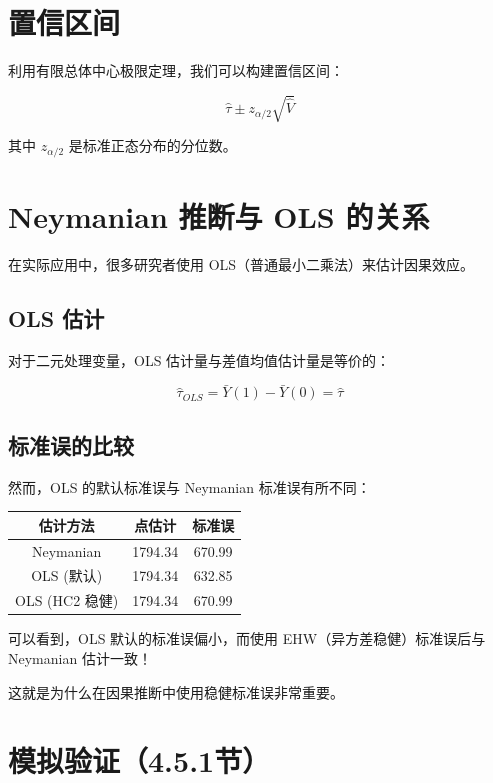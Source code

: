 \section{置信区间}

利用有限总体中心极限定理，我们可以构建置信区间：

\[
\hat{\tau} \pm z_{\alpha/2} \sqrt{\hat{V}}
\]

其中 $z_{\alpha/2}$ 是标准正态分布的分位数。


\section{Neymanian 推断与 OLS 的关系}

在实际应用中，很多研究者使用 OLS（普通最小二乘法）来估计因果效应。

\subsection{OLS 估计}

对于二元处理变量，OLS 估计量与差值均值估计量是等价的：

\[
\hat{\tau}_{OLS} = \bar{Y}(1) - \bar{Y}(0) = \hat{\tau}
\]

\subsection{标准误的比较}

然而，OLS 的默认标准误与 Neymanian 标准误有所不同：

\begin{center}
\begin{tabular}{c|c|c}
\hline
估计方法 & 点估计 & 标准误 \\
\hline
Neymanian & 1794.34 & 670.99 \\
OLS (默认) & 1794.34 & 632.85 \\
OLS (HC2 稳健) & 1794.34 & 670.99 \\
\hline
\end{tabular}
\end{center}

可以看到，OLS 默认的标准误偏小，而使用 EHW（异方差稳健）标准误后与 Neymanian 估计一致！

这就是为什么在因果推断中使用稳健标准误非常重要。

\section{模拟验证（4.5.1节）}

